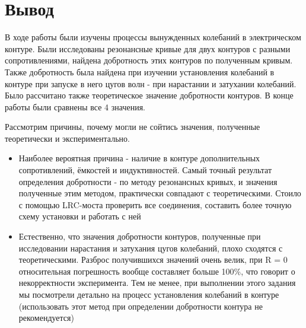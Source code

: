 \documentclass[a4paper]{article}
\begin{document}
\section{Вывод}
В ходе работы были изучены процессы вынужденных колебаний в электрическом контуре. Были исследованы резонансные кривые для двух контуров с разными сопротивлениями, найдена добротность этих контуров по полученным кривым. Также добротность была найдена при изучении установления колебаний в контуре при запуске в него цугов волн - при нарастании и затухании колебаний. Было рассчитано также теоретическое значение добротности контуров. В конце работы были сравнены все 4 значения. \par
Рассмотрим причины, почему могли не сойтись значения, полученные теоретически и экспериментально. 
\begin{itemize}
    \item Наиболее вероятная причина - наличие в контуре дополнительных сопротивлений, ёмкостей и индуктивностей. Самый точный результат определения добротности - по методу резонансных кривых, и значения полученные этим методом, практически совпадают с теоретическими. Стоило с помощью LRC-моста проверить все соединения, составить более точную схему установки и работать с ней
    \item Естественно, что значения добротности контуров, полученные при исследовании нарастания и затухания цугов колебаний, плохо сходятся с теоретическими. Разброс получившихся значений очень велик, при R = 0 относительная погрешность вообще составляет больше 100\%, что говорит о некорректности эксперимента. Тем не менее, при выполнении этого задания мы посмотрели детально на процесс установления колебаний в контуре (использовать этот метод при определении добротности контура не рекомендуется)
\end{itemize}
\end{document}

